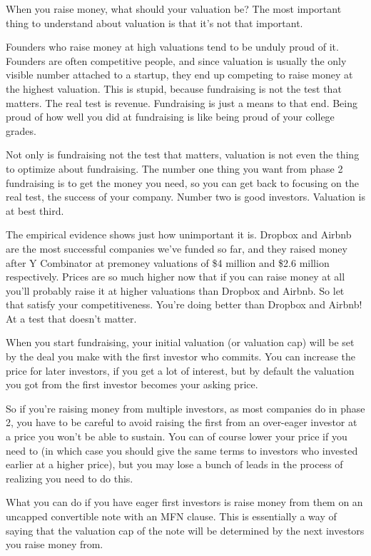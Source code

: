 \documentclass[12pt]{book}
\begin{document}
When you raise money, what should your valuation be? The most important
thing to understand about valuation is that it's not that important.

Founders who raise money at high valuations tend to be unduly proud of
it. Founders are often competitive people, and since valuation is
usually the only visible number attached to a startup, they end up
competing to raise money at the highest valuation. This is stupid,
because fundraising is not the test that matters. The real test is
revenue. Fundraising is just a means to that end. Being proud of how
well you did at fundraising is like being proud of your college grades.

Not only is fundraising not the test that matters, valuation is not even
the thing to optimize about fundraising. The number one thing you want
from phase 2 fundraising is to get the money you need, so you can get
back to focusing on the real test, the success of your company. Number
two is good investors. Valuation is at best third.

The empirical evidence shows just how unimportant it is. Dropbox and
Airbnb are the most successful companies we've funded so far, and they
raised money after Y Combinator at premoney valuations of \$4 million
and \$2.6 million respectively. Prices are so much higher now that if
you can raise money at all you'll probably raise it at higher valuations
than Dropbox and Airbnb. So let that satisfy your competitiveness.
You're doing better than Dropbox and Airbnb! At a test that doesn't
matter.

When you start fundraising, your initial valuation (or valuation cap)
will be set by the deal you make with the first investor who commits.
You can increase the price for later investors, if you get a lot of
interest, but by default the valuation you got from the first investor
becomes your asking price.

So if you're raising money from multiple investors, as most companies do
in phase 2, you have to be careful to avoid raising the first from an
over-eager investor at a price you won't be able to sustain. You can of
course lower your price if you need to (in which case you should give
the same terms to investors who invested earlier at a higher price), but
you may lose a bunch of leads in the process of realizing you need to do
this.

What you can do if you have eager first investors is raise money from
them on an uncapped convertible note with an MFN clause. This is
essentially a way of saying that the valuation cap of the note will be
determined by the next investors you raise money from.
\end{document}
